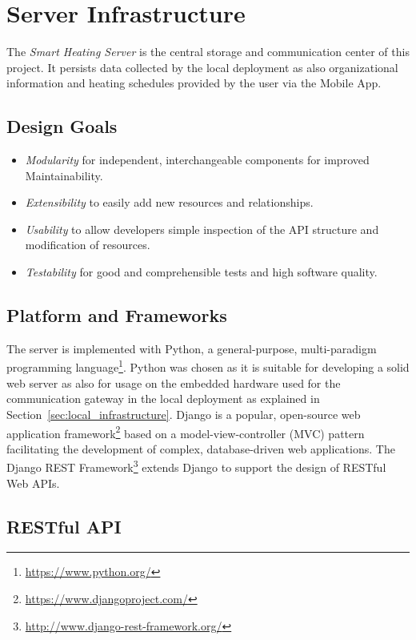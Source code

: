 
\section{Server Infrastructure}
\label{sec:server_infrastructure}

The \emph{Smart Heating Server} is the central storage and communication center of this project.
It persists data collected by the local deployment as also organizational information and heating schedules provided by the user via the Mobile App.

\subsection{Design Goals}

\begin{itemize}
\item \emph{Modularity} for independent, interchangeable components for improved Maintainability.
\item \emph{Extensibility} to easily add new resources and relationships.
\item \emph{Usability} to allow developers simple inspection of the API structure and modification of resources.
\item \emph{Testability} for good and comprehensible tests and high software quality.
\end{itemize}

\subsection{Platform and Frameworks}

The server is implemented with Python, a general-purpose, multi-paradigm programming language\footnote{\url{https://www.python.org/}}.
Python was chosen as it is suitable for developing a solid web server as also for usage on the embedded hardware used for the communication gateway in the local deployment as explained in Section~\ref{sec:local_infrastructure}.
Django is a popular, open-source web application framework\footnote{\url{https://www.djangoproject.com/}} based on a model-view-controller (MVC) pattern facilitating the development of complex, database-driven web applications.
The Django REST Framework\footnote{\url{http://www.django-rest-framework.org/}} extends Django to support the design of RESTful Web APIs.

\subsection{RESTful API}


